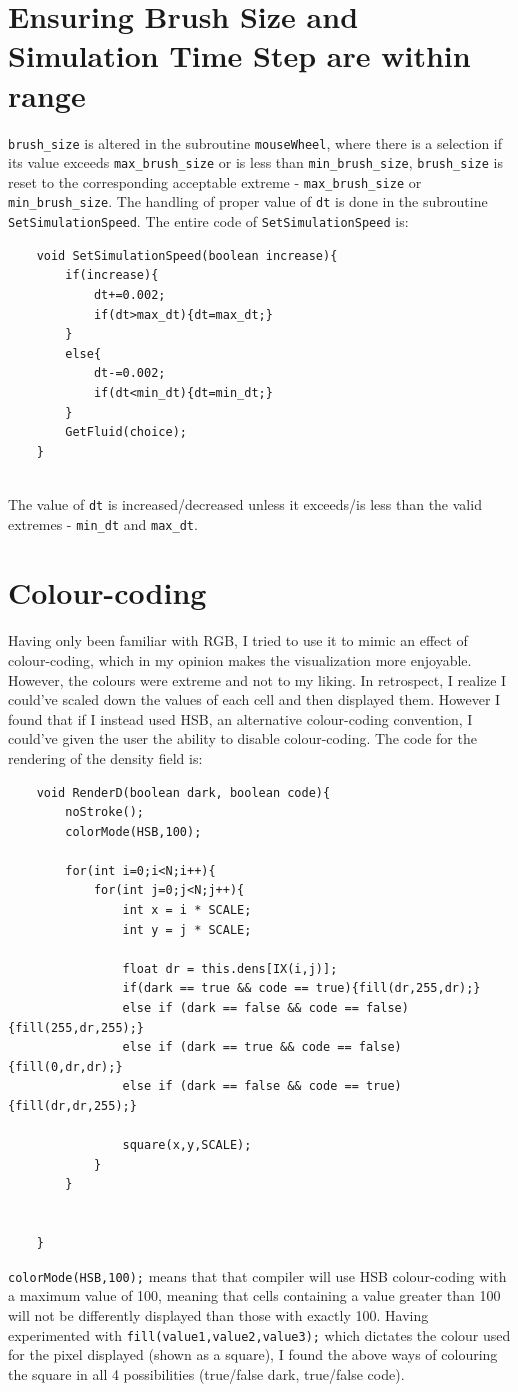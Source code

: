 \documentclass[12pt,a4paper]{book}
\begin{document}
\section{Ensuring Brush Size and Simulation Time Step are within range}
\verb|brush_size| is altered in the subroutine \verb|mouseWheel|, where there is a selection if its value exceeds \verb|max_brush_size| or is less than \verb|min_brush_size|, \verb|brush_size| is reset to the corresponding acceptable extreme - \verb|max_brush_size| or \verb|min_brush_size|. The handling of proper value of \verb|dt| is done in the subroutine \verb|SetSimulationSpeed|. The entire code of \verb|SetSimulationSpeed| is:
\begin{lstlisting}
	void SetSimulationSpeed(boolean increase){
		if(increase){
			dt+=0.002;
			if(dt>max_dt){dt=max_dt;}
		}
		else{
			dt-=0.002;
			if(dt<min_dt){dt=min_dt;}
		}
		GetFluid(choice);
	}
	
\end{lstlisting}
The value of \verb|dt| is increased/decreased unless it exceeds/is less than the valid extremes - \verb|min_dt| and \verb|max_dt|.\\


\section{Colour-coding}
Having only been familiar with RGB, I tried to use it to mimic an effect of colour-coding, which in my opinion makes the visualization more enjoyable. However, the colours were extreme and not to my liking. In retrospect, I realize I could've scaled down the values of each cell and then displayed them. However I found that if I instead used HSB, an alternative colour-coding convention, I could've given the user the ability to disable colour-coding. The code for the rendering of the density field is:
\begin{lstlisting}
	void RenderD(boolean dark, boolean code){
		noStroke();
		colorMode(HSB,100);
		
		for(int i=0;i<N;i++){
			for(int j=0;j<N;j++){
				int x = i * SCALE;
				int y = j * SCALE;
				
				float dr = this.dens[IX(i,j)];
				if(dark == true && code == true){fill(dr,255,dr);}
				else if (dark == false && code == false){fill(255,dr,255);}
				else if (dark == true && code == false){fill(0,dr,dr);}
				else if (dark == false && code == true){fill(dr,dr,255);}
				
				square(x,y,SCALE);
			}
		}
		
		
	}
\end{lstlisting}
\verb|colorMode(HSB,100);| means that that compiler will use HSB colour-coding with a maximum value of 100, meaning that cells containing a value greater than 100 will not be differently displayed than those with exactly 100. Having experimented with \verb|fill(value1,value2,value3);| which dictates the colour used for the pixel displayed (shown as a square), I found the above ways of colouring the square in all 4 possibilities (true/false dark, true/false code).\\
\end{document}
